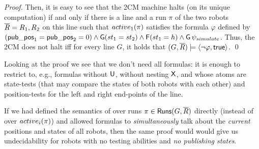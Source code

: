 \begin{proof}
Then, it is easy to see that the 2CM machine halts (on its unique computation) if and only if there is a line and a run $\pi$ of the two robots $\overline{R} = R_1,R_2$ on this line such that $active_1(\pi)$ satisfies the \RLTL formula $\varphi$ defined by $(\mathsf{pub\_pos}_1 = \mathsf{pub\_pos}_2 = 0) \wedge \operatorname{\mathsf{G}} (st_1 = st_2) \wedge \operatorname{\mathsf{F}} (st_1  = h) \wedge \operatorname{\mathsf{G}} \psi_{simulate}$. Thus, the 2CM does not halt iff for every line $G$, it holds that $(G,\overline{R}) \models \langle {\neg \varphi,\mathsf{true}} \rangle$.
\qed
\end{proof}





\begin{remark}
Looking at the proof we see that we don't need all \RLTL formulas: it is enough to restrict to, e.g., \RLTL formulas without $\operatorname{\mathbin{\mathsf{U}}}$, without nesting $\operatorname{\mathsf{X}}$, and whose atoms are state-tests (that may compare the states of both robots with each other) and position-tests for the left and right end-points of the line.
\end{remark}

\begin{remark}
If we had defined the semantics of \RLTL over runs $\pi \in \mathsf{Runs}(G,\overline{R})$ directly (instead of over $active_i(\pi)$) and allowed formulas to \emph{simultaneously} talk about the \emph{current} positions and states of all robots, then the same proof would would give us undecidability for robots
with no testing abilities and \emph{no publishing states}. 
\end{remark}



